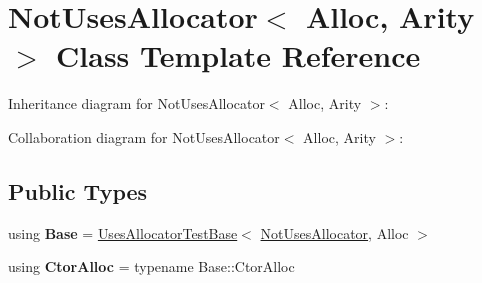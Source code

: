 \hypertarget{class_not_uses_allocator}{}\section{Not\+Uses\+Allocator$<$ Alloc, Arity $>$ Class Template Reference}
\label{class_not_uses_allocator}


Inheritance diagram for Not\+Uses\+Allocator$<$ Alloc, Arity $>$\+:


Collaboration diagram for Not\+Uses\+Allocator$<$ Alloc, Arity $>$\+:
\subsection*{Public Types}
\begin{DoxyCompactItemize}
\item 
\mbox{\label{class_not_uses_allocator_a14526018a026347e1daafcf3a4681497}} 
using {\bfseries Base} = \mbox{\hyperlink{struct_uses_allocator_test_base}{Uses\+Allocator\+Test\+Base}}$<$ \mbox{\hyperlink{class_not_uses_allocator}{Not\+Uses\+Allocator}}, Alloc $>$
\item 
\mbox{\label{class_not_uses_allocator_a069de9c2dfc5e2a9e0c05cd4a610af0e}} 
using {\bfseries Ctor\+Alloc} = typename Base\+::\+Ctor\+Alloc
\end{DoxyCompactItemize}
